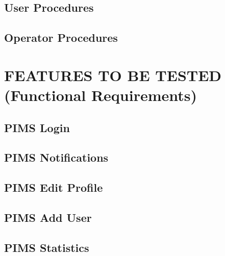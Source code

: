 \documentclass[a4paper,12pt,titlepage]{article}
\begin{document}
	\subsection{User Procedures}
	\subsection{Operator Procedures}
	
\section{FEATURES TO BE TESTED (Functional Requirements)}
	\subsection{PIMS Login}
	
	\subsection{PIMS Notifications}
	
	\subsection{PIMS Edit Profile}
	
	\subsection{PIMS Add User}
	
	\subsection{PIMS Statistics}
	
	
\end{document}
